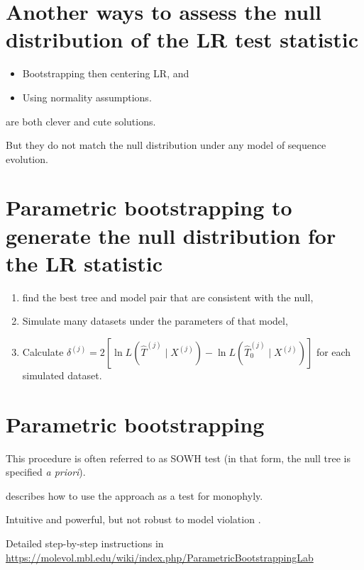 \documentclass[landscape]{foils}
\begin{document}
\myNewSlide
\section*{Another ways to assess the null distribution of the LR test statistic}
\begin{itemize}
	\item Bootstrapping then centering LR, and 
	\item Using normality assumptions.
\end{itemize}
are both clever and cute solutions.

But they do not match the null distribution under any model of sequence evolution.

\myNewSlide
\section*{Parametric bootstrapping to generate the null distribution for the LR statistic}
\begin{enumerate}
	\item find the best tree and model pair that are consistent with the null,
	\item Simulate many datasets under the parameters of that model,
	\item Calculate $\delta^{(j)} = 2\left[\ln L (\hat{T}^{(j)} \mid  X^{(j)}) - \ln L (\hat{T}_{0}^{(j)} \mid  X^{(j)})\right]$ for each simulated dataset.
\end{enumerate}

\myNewSlide
\section*{Parametric bootstrapping}
This procedure is often referred to as SOWH test (in that form, the null tree is specified {\em a priori}).

\citet{HuelsenbeckHN1996} describes how to use the approach as a test for monophyly.

Intuitive and powerful, but not robust to model violation \citep{Buckley2002}.

Detailed step-by-step instructions in \url{https://molevol.mbl.edu/wiki/index.php/ParametricBootstrappingLab}
\end{document}
